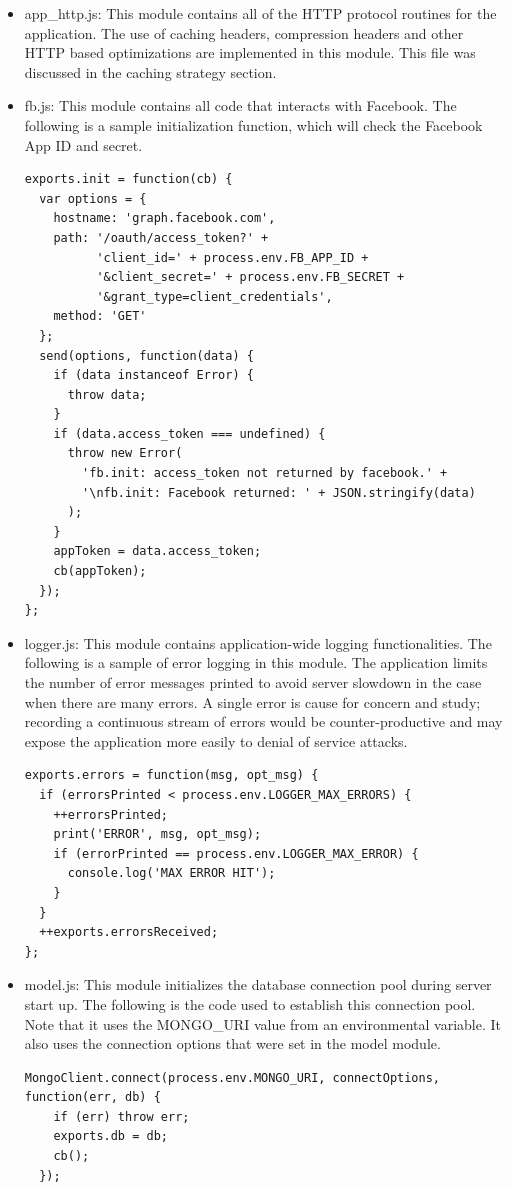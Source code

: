 \begin{itemize}
\item app{\_}http.js: This module contains all of the HTTP protocol routines for the application.  The use of caching headers, compression headers and other HTTP based optimizations are implemented in this module. This file was discussed in the caching strategy section.

\item fb.js: This module contains all code that interacts with Facebook. The following is a sample initialization function, which will check the Facebook App ID and secret.
\begin{lstlisting}
exports.init = function(cb) {  
  var options = {
    hostname: 'graph.facebook.com',
    path: '/oauth/access_token?' + 
          'client_id=' + process.env.FB_APP_ID +
          '&client_secret=' + process.env.FB_SECRET +
          '&grant_type=client_credentials',
    method: 'GET'
  };
  send(options, function(data) {
    if (data instanceof Error) {
      throw data;
    }
    if (data.access_token === undefined) {
      throw new Error(
        'fb.init: access_token not returned by facebook.' +
        '\nfb.init: Facebook returned: ' + JSON.stringify(data)
      );
    }
    appToken = data.access_token;
    cb(appToken);
  });
};
\end{lstlisting} 


\item logger.js: This module contains application-wide logging functionalities. The following is a sample of error logging in this module.  The application limits the number of error messages printed to avoid server slowdown in the case when there are many errors.  A single error is cause for concern and study; recording a continuous stream of errors would be counter-productive and may expose the application more easily to denial of service attacks.  
\begin{lstlisting} 
exports.errors = function(msg, opt_msg) {
  if (errorsPrinted < process.env.LOGGER_MAX_ERRORS) {
    ++errorsPrinted;
    print('ERROR', msg, opt_msg);
    if (errorPrinted == process.env.LOGGER_MAX_ERROR) {
      console.log('MAX ERROR HIT');
    }
  }
  ++exports.errorsReceived;
};
\end{lstlisting} 

\item model.js: This module initializes the database connection pool during server start up. The following is the code used to establish this connection pool. Note that it uses the MONGO{\_}URI value from an environmental variable.  It also uses the connection options that were set in the model module.
\begin{lstlisting} 
MongoClient.connect(process.env.MONGO_URI, connectOptions, function(err, db) {
    if (err) throw err;
    exports.db = db;
    cb();
  }); 
\end{lstlisting} 


\end{itemize}
